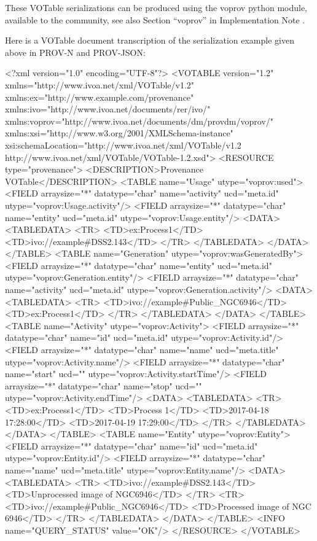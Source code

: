These VOTable serializations can be produced using the voprov python module, available to the community, see also Section ``voprov'' in Implementation Note \citep[]{std:ProvenanceImplementationNote}.

Here is a VOTable document transcription of the serialization example given above in PROV-N and PROV-JSON:

\begin{verbnobox}[\scriptsize]
<?xml version="1.0" encoding="UTF-8"?>
<VOTABLE version="1.2" xmlns="http://www.ivoa.net/xml/VOTable/v1.2" 
  xmlns:ex="http://www.example.com/provenance" 
  xmlns:ivo="http://www.ivoa.net/documents/rer/ivo/"
  xmlns:voprov="http://www.ivoa.net/documents/dm/provdm/voprov/" 
  xmlns:xsi="http://www.w3.org/2001/XMLSchema-instance" 
  xsi:schemaLocation="http://www.ivoa.net/xml/VOTable/v1.2 http://www.ivoa.net/xml/VOTable/VOTable-1.2.xsd">
  <RESOURCE type="provenance">
    <DESCRIPTION>Provenance VOTable</DESCRIPTION>
    <TABLE name="Usage" utype="voprov:used">
      <FIELD arraysize="*" datatype="char" name="activity" ucd="meta.id" utype="voprov:Usage.activity"/>
      <FIELD arraysize="*" datatype="char" name="entity" ucd="meta.id" utype="voprov:Usage.entity"/>
      <DATA>
        <TABLEDATA>
          <TR>
            <TD>ex:Process1</TD>
            <TD>ivo://example#DSS2.143</TD>
          </TR>
        </TABLEDATA>
      </DATA>
    </TABLE>
    <TABLE name="Generation" utype="voprov:wasGeneratedBy">
      <FIELD arraysize="*" datatype="char" name="entity" ucd="meta.id" utype="voprov:Generation.entity"/>
      <FIELD arraysize="*" datatype="char" name="activity" ucd="meta.id" utype="voprov:Generation.activity"/>
      <DATA>
        <TABLEDATA>
          <TR>
            <TD>ivo://example#Public_NGC6946</TD>
            <TD>ex:Process1</TD>
          </TR>
        </TABLEDATA>
      </DATA>
    </TABLE>
    <TABLE name="Activity" utype="voprov:Activity">
      <FIELD arraysize="*" datatype="char" name="id" ucd="meta.id" utype="voprov:Activity.id"/>
      <FIELD arraysize="*" datatype="char" name="name" ucd="meta.title" utype="voprov:Activity.name"/>
      <FIELD arraysize="*" datatype="char" name="start" ucd="" utype="voprov:Activity.startTime"/>
      <FIELD arraysize="*" datatype="char" name="stop" ucd="" utype="voprov:Activity.endTime"/>
      <DATA>
        <TABLEDATA>
          <TR>
            <TD>ex:Process1</TD>
            <TD>Process 1</TD>
            <TD>2017-04-18 17:28:00</TD>
            <TD>2017-04-19 17:29:00</TD>
          </TR>
        </TABLEDATA>
      </DATA>
    </TABLE>
    <TABLE name="Entity" utype="voprov:Entity">
      <FIELD arraysize="*" datatype="char" name="id" ucd="meta.id" utype="voprov:Entity.id"/>
      <FIELD arraysize="*" datatype="char" name="name" ucd="meta.title" utype="voprov:Entity.name"/>
      <DATA>
        <TABLEDATA>
          <TR>
            <TD>ivo://example#DSS2.143</TD>
            <TD>Unprocessed image of NGC6946</TD>
          </TR>
          <TR>
            <TD>ivo://example#Public_NGC6946</TD>
            <TD>Processed image of NGC 6946</TD>
          </TR>
        </TABLEDATA>
      </DATA>
    </TABLE>
    <INFO name="QUERY_STATUS" value="OK"/>
  </RESOURCE>
</VOTABLE>

\end{verbnobox}


